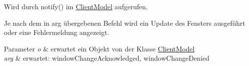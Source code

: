 Wird durch notify() im \hyperlink{a00013}{Client\-Model} aufgerufen. 

Je nach dem in arg übergebenen Befehl wird ein Update des Fensters ausgeführt oder eine Fehlermeldung angezeigt.


\begin{DoxyParams}{Parameter}
{\em o} & erwartet ein Objekt von der Klasse \hyperlink{a00013}{Client\-Model} \\
\hline
{\em arg} & erwartet\-: window\-Change\-Acknowledged, window\-Change\-Denied \\
\hline
\end{DoxyParams}
